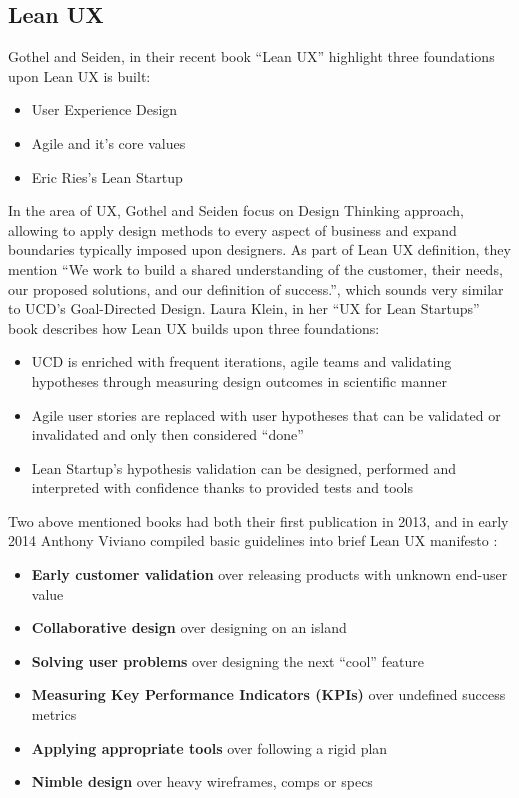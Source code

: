\documentclass{article}
\begin{document}
\subsection{Lean UX}
Gothel and Seiden, in their recent book ``Lean UX'' \cite{gothelf2016lean} highlight three foundations upon Lean UX is built:
\begin{itemize}
  \item User Experience Design
  \item Agile and it's core values
  \item Eric Ries's Lean Startup
\end{itemize}
In the area of UX, Gothel and Seiden focus on Design Thinking approach, allowing to apply design methods to every aspect of business and expand boundaries typically imposed upon designers. As part of Lean UX definition, they mention ``We work to build a shared understanding of the customer, their needs, our
proposed solutions, and our definition of success.'', which sounds very similar to UCD's Goal-Directed Design.
Laura Klein, in her ``UX for Lean Startups'' \cite{klein2013ux} book describes how Lean UX builds upon three foundations:
\begin{itemize}
  \item UCD is enriched with frequent iterations, agile teams and validating hypotheses through measuring design outcomes in scientific manner
  \item Agile user stories are replaced with user hypotheses that can be validated or invalidated and only then considered ``done''
  \item Lean Startup's hypothesis validation can be designed, performed and interpreted with confidence thanks to provided tests and tools
\end{itemize}
Two above mentioned books had both their first publication in 2013, and in early 2014 Anthony Viviano compiled basic guidelines into brief Lean UX manifesto \cite{viviano2014lean}:
\begin{itemize}
  \item \textbf{Early customer validation} over releasing products with unknown end-user value
  \item \textbf{Collaborative design} over designing on an island
  \item \textbf{Solving user problems} over designing the next “cool” feature
  \item \textbf{Measuring Key Performance Indicators (KPIs)} over undefined success metrics
  \item \textbf{Applying appropriate tools} over following a rigid plan
  \item \textbf{Nimble design} over heavy wireframes, comps or specs
\end{itemize}
\end{document}
